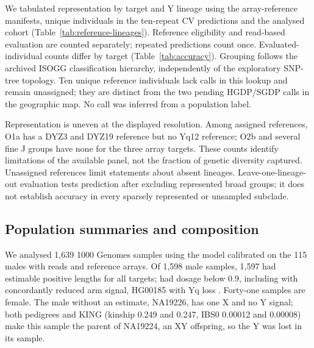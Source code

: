 We tabulated representation by target and Y lineage using the array-reference manifests, unique individuals in the ten-repeat CV predictions and the analysed cohort (Table~\ref{tab:reference-lineages}). Reference eligibility and read-based evaluation are counted separately; repeated predictions count once. Evaluated-individual counts differ by target (Table~\ref{tab:accuracy}). Grouping follows the archived ISOGG classification hierarchy, independently of the exploratory SNP-tree topology. Ten unique reference individuals lack calls in this lookup and remain unassigned; they are distinct from the two pending HGDP/SGDP calls in the geographic map. No call was inferred from a population label.

Representation is uneven at the displayed resolution. Among assigned references, O1a has a DYZ3 and DYZ19 reference but no Yq12 reference; O2b and several fine J groups have none for the three array targets. These counts identify limitations of the available panel, not the fraction of genetic diversity captured. Unassigned references limit statements about absent lineages. Leave-one-lineage-out evaluation tests prediction after excluding represented broad groups; it does not establish accuracy in every sparsely represented or unsampled subclade.



\subsection{Population summaries and composition}\label{sec:m-population}
We analysed 1,639 1000 Genomes samples using the model calibrated on the 115 males with reads and reference arrays. Of 1,598 male samples, 1,597 had estimable positive lengths for all  targets;  had dosage below 0.9, including  with concordantly reduced arm signal, HG00185 with Yq loss . Forty-one samples are female. The male without an estimate, NA19226, has one X and no Y signal; both pedigrees and KING (kinship 0.249 and 0.247, IBS0 0.00012 and 0.00008) make this sample the parent of NA19224, an XY offspring, so the Y was lost in its sample.


